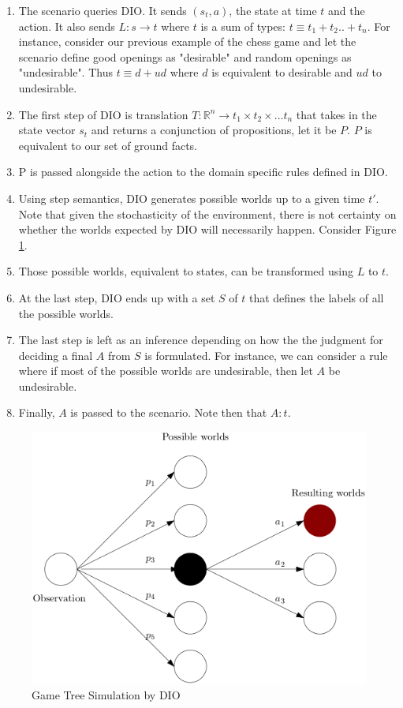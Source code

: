 \documentclass[a4paper,11pt]{article}
\theoremstyle{definition}
\begin{document}
\begin{enumerate}
  \item The scenario queries DIO. It sends $(s_t, a)$, the state at time $t$ and the action. It also sends $L : s \rightarrow t$ where $t$ is a sum of types: 
        $t \equiv t_1 + t_2 .. + t_n$. For instance, consider our previous example of the chess game and let the scenario define good openings as "desirable" and random openings as 
        "undesirable". Thus $t \equiv d + ud$ where $d$ is equivalent to desirable and $ud$ to undesirable. 
  \item The first step of DIO is translation $T : \mathbb{R}^n \rightarrow t_1 \times t_2 \times ... t_n$ that takes in the state vector $s_t$ and returns a conjunction of propositions, let it be $P$. $P$ is equivalent to 
        our set of ground facts.
  \item P is passed alongside the action to the domain specific rules defined in DIO. 
  \item Using step semantics, DIO generates possible worlds up to a given time $t'$. Note that given the stochasticity of the environment, there is not certainty on
        whether the worlds expected by DIO will necessarily happen. Consider Figure \ref{fig:diosim}.
  \item Those possible worlds, equivalent to states, can be transformed using $L$ to $t$. 
  \item At the last step, DIO ends up with a set $S$ of $t$ that defines the labels of all the possible worlds.
  \item The last step is left as an inference depending on how the the judgment for deciding a final $A$ from $S$ 
        is formulated. For instance, we can consider a rule where if most of the possible worlds are undesirable, then let $A$ be undesirable.
  \item Finally, $A$ is passed to the scenario. Note then that $A : t$. 
\end{enumerate}

\begin{figure}[H]
  \centering
  \includegraphics[scale=0.55]{scworlds.png}
  \caption{Game Tree Simulation by DIO}
  \label{fig:diosim}
\end{figure}
\end{document}
